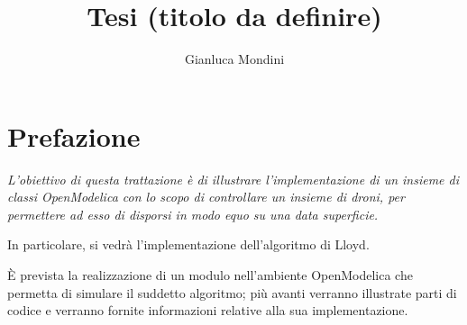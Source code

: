 \documentclass[11pt,a4paper]{report}
\author{Gianluca Mondini}
\title{Tesi (titolo da definire)}
\newcommand{\emptypage}[0]{\afterpage{\null\newpage}}
\begin{document}
\setlength{\parindent}{0pt}




\emptypage

\chapter*{Prefazione}


{\em \large
L'obiettivo di questa trattazione è di illustrare l'implementazione di un insieme di classi OpenModelica con lo scopo di controllare un insieme di droni, per permettere ad esso di disporsi in modo equo su una data superficie.

In particolare, si vedrà l'implementazione dell'algoritmo di Lloyd.

È prevista la realizzazione di un modulo nell'ambiente OpenModelica che permetta di simulare il suddetto algoritmo; più avanti verranno illustrate parti di codice e verranno fornite informazioni relative alla sua implementazione.
}
\pagebreak

\emptypage

\tableofcontents

\pagebreak



\end{document}
